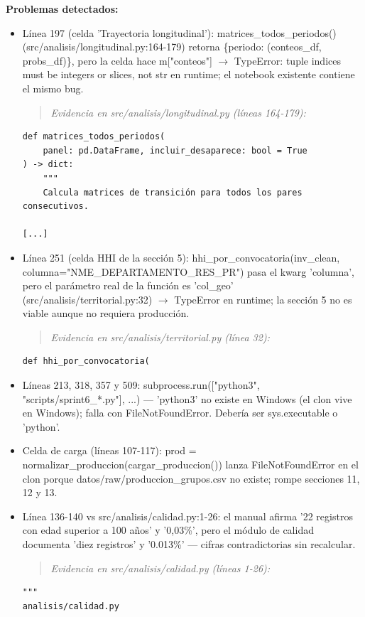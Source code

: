 \begin{tcolorbox}[riesgo]
\textbf{Problemas detectados:}
\begin{itemize}
  \item Línea 197 (celda 'Trayectoria longitudinal'): matrices\_todos\_periodos() (src/analisis/longitudinal.py:164-179) retorna \{periodo: (conteos\_df, probs\_df)\}, pero la celda hace m["conteos"] $\rightarrow$ TypeError: tuple indices must be integers or slices, not str en runtime; el notebook existente contiene el mismo bug.
\begin{quote}\footnotesize\ttfamily
\noindent\emph{Evidencia en src/analisis/longitudinal.py (líneas 164-179):}
\end{quote}
\begin{lstlisting}
def matrices_todos_periodos(
    panel: pd.DataFrame, incluir_desaparece: bool = True
) -> dict:
    """
    Calcula matrices de transición para todos los pares consecutivos.

[...]
\end{lstlisting}

  \item Línea 251 (celda HHI de la sección 5): hhi\_por\_convocatoria(inv\_clean, columna="NME\_DEPARTAMENTO\_RES\_PR") pasa el kwarg 'columna', pero el parámetro real de la función es 'col\_geo' (src/analisis/territorial.py:32) $\rightarrow$ TypeError en runtime; la sección 5 no es viable aunque no requiera producción.
\begin{quote}\footnotesize\ttfamily
\noindent\emph{Evidencia en src/analisis/territorial.py (línea 32):}
\end{quote}
\begin{lstlisting}
def hhi_por_convocatoria(
\end{lstlisting}

  \item Líneas 213, 318, 357 y 509: subprocess.run(["python3", "scripts/sprint6\_*.py"], ...) --- 'python3' no existe en Windows (el clon vive en Windows); falla con FileNotFoundError. Debería ser sys.executable o 'python'.
  \item Celda de carga (líneas 107-117): prod = normalizar\_produccion(cargar\_produccion()) lanza FileNotFoundError en el clon porque datos/raw/produccion\_grupos.csv no existe; rompe secciones 11, 12 y 13.
  \item Línea 136-140 vs src/analisis/calidad.py:1-26: el manual afirma '22 registros con edad superior a 100 años' y '0,03\%', pero el módulo de calidad documenta 'diez registros' y '0.013\%' --- cifras contradictorias sin recalcular.
\begin{quote}\footnotesize\ttfamily
\noindent\emph{Evidencia en src/analisis/calidad.py (líneas 1-26):}
\end{quote}
\begin{lstlisting}
"""
analisis/calidad.py


\end{lstlisting}
\end{itemize}
\end{tcolorbox}
